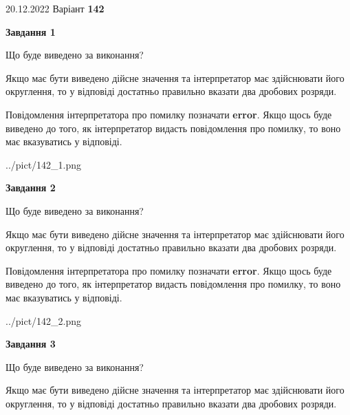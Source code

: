 \documentclass[12pt, ukrainian]{article}
\begin{document}
{20.12.2022 Варіант \No \textbf { 142 }\par}
{
\begin {Large}

{\begin {center}\textbf{Завдання 1}\end {center}}\par
Що буде виведено за виконання? \par

Якщо має бути виведено дійсне значення та інтерпретатор має здійснювати його округлення, 
то у відповіді достатньо правильно вказати два дробових розряди.

Повідомлення інтерпретатора про помилку позначати \textbf{error}.
Якщо щось буде виведено до того, як інтерпретатор видасть повідомлення про помилку, 
то воно має вказуватись у відповіді. \par

\begin{center}
	{../pict/142_1.png}
\end{center}
\newpage

{\begin {center}\textbf{Завдання 2}\end {center}}\par
Що буде виведено за виконання? \par

Якщо має бути виведено дійсне значення та інтерпретатор має здійснювати його округлення, 
то у відповіді достатньо правильно вказати два дробових розряди.

Повідомлення інтерпретатора про помилку позначати \textbf{error}.
Якщо щось буде виведено до того, як інтерпретатор видасть повідомлення про помилку, 
то воно має вказуватись у відповіді. \par

\begin{center}
	{../pict/142_2.png}
\end{center}
\newpage

{\begin {center}\textbf{Завдання 3}\end {center}}\par
Що буде виведено за виконання? \par

Якщо має бути виведено дійсне значення та інтерпретатор має здійснювати його округлення, 
то у відповіді достатньо правильно вказати два дробових розряди.


\end{Large}}
\end{document}
